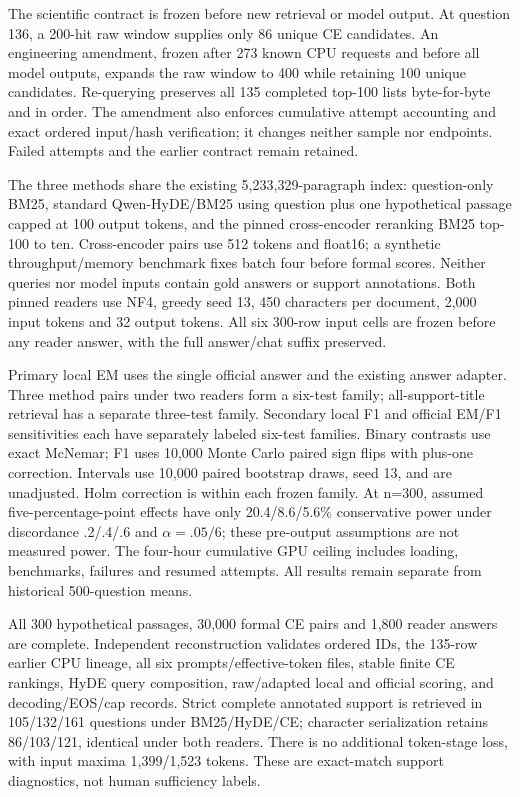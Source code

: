 The scientific contract is frozen before new retrieval or model output. At question 136, a 200-hit raw window supplies only 86 unique CE candidates. An engineering amendment, frozen after 273 known CPU requests and before all model outputs, expands the raw window to 400 while retaining 100 unique candidates. Re-querying preserves all 135 completed top-100 lists byte-for-byte and in order. The amendment also enforces cumulative attempt accounting and exact ordered input/hash verification; it changes neither sample nor endpoints. Failed attempts and the earlier contract remain retained.

The three methods share the existing 5,233,329-paragraph index: question-only BM25, standard Qwen-HyDE/BM25 using question plus one hypothetical passage capped at 100 output tokens, and the pinned cross-encoder reranking BM25 top-100 to ten. Cross-encoder pairs use 512 tokens and float16; a synthetic throughput/memory benchmark fixes batch four before formal scores. Neither queries nor model inputs contain gold answers or support annotations. Both pinned readers use NF4, greedy seed 13, 450 characters per document, 2,000 input tokens and 32 output tokens. All six 300-row input cells are frozen before any reader answer, with the full answer/chat suffix preserved.

Primary local EM uses the single official answer and the existing answer adapter. Three method pairs under two readers form a six-test family; all-support-title retrieval has a separate three-test family. Secondary local F1 and official EM/F1 sensitivities each have separately labeled six-test families. Binary contrasts use exact McNemar; F1 uses 10,000 Monte Carlo paired sign flips with plus-one correction. Intervals use 10,000 paired bootstrap draws, seed 13, and are unadjusted. Holm correction is within each frozen family. At n=300, assumed five-percentage-point effects have only 20.4/8.6/5.6\% conservative power under discordance .2/.4/.6 and $\alpha=.05/6$; these pre-output assumptions are not measured power. The four-hour cumulative GPU ceiling includes loading, benchmarks, failures and resumed attempts. All results remain separate from historical 500-question means.

All 300 hypothetical passages, 30,000 formal CE pairs and 1,800 reader answers are complete. Independent reconstruction validates ordered IDs, the 135-row earlier CPU lineage, all six prompts/effective-token files, stable finite CE rankings, HyDE query composition, raw/adapted local and official scoring, and decoding/EOS/cap records. Strict complete annotated support is retrieved in 105/132/161 questions under BM25/HyDE/CE; character serialization retains 86/103/121, identical under both readers. There is no additional token-stage loss, with input maxima 1,399/1,523 tokens. These are exact-match support diagnostics, not human sufficiency labels.

